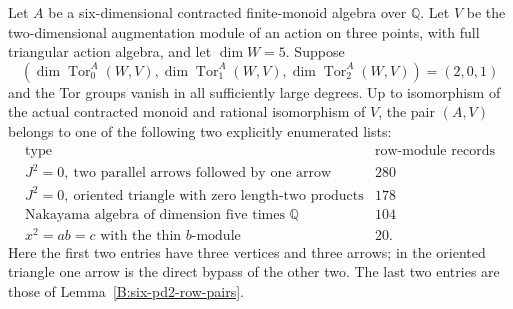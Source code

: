 \begin{proposition}
\label{B:six-row-census}
Let $A$ be a six-dimensional contracted finite-monoid algebra over
$\mathbb Q$.  Let $V$ be the two-dimensional augmentation module
of an action on three points, with full triangular action algebra,
and let $\dim W=5$.  Suppose
\[
 (\dim\operatorname{Tor}_0^A(W,V),
   \dim\operatorname{Tor}_1^A(W,V),
   \dim\operatorname{Tor}_2^A(W,V))=(2,0,1)
\]
and the Tor groups vanish in all sufficiently large degrees.
Up to isomorphism of the actual contracted monoid and rational
isomorphism of $V$, the pair $(A,V)$ belongs to one of the
following two explicitly enumerated lists:
\[
\begin{array}{c|r}
\text{type}&\text{row-module records}\\\hline
 J^2=0,\ \text{two parallel arrows followed by one arrow}&280\\
 J^2=0,\ \text{oriented triangle with zero length-two products}&178\\
 \text{Nakayama algebra of dimension five times }\mathbb Q&104\\
 x^2=ab=c\text{ with the thin }b\text{-module}&20.
\end{array}
\]
Here the first two entries have three vertices and three arrows;
in the oriented triangle one arrow is the direct bypass of the
other two.  The last two entries are those of
Lemma~\ref{B:six-pd2-row-pairs}.
\end{proposition}
